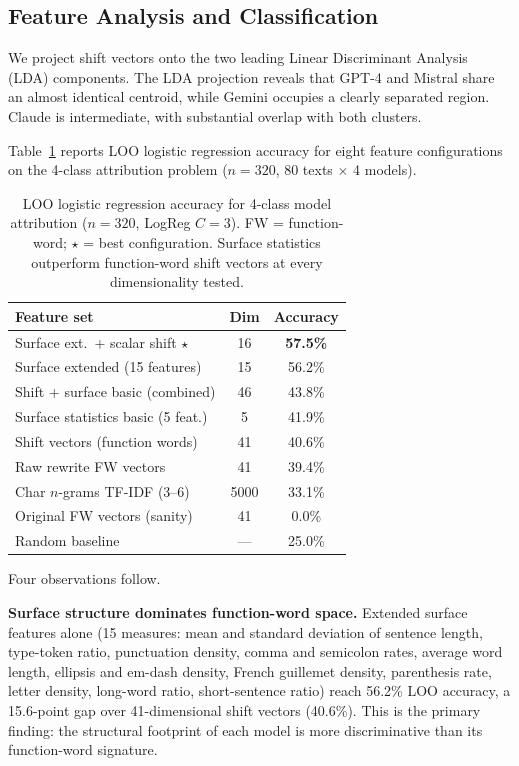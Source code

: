 \documentclass[11pt,a4paper]{article}
\begin{document}
\subsection{Feature Analysis and Classification}

We project shift vectors onto the two leading Linear Discriminant
Analysis (LDA) components.
The LDA projection reveals that GPT-4 and
Mistral share an almost identical centroid, while Gemini occupies
a clearly separated region.
Claude is intermediate, with substantial overlap with both clusters.

Table~\ref{tab:baselines} reports LOO logistic regression accuracy
for eight feature configurations on the 4-class attribution problem
($n = 320$, 80 texts $\times$ 4 models).

\begin{table}[h]
\centering
\small
\begin{tabular}{lcc}
\toprule
\textbf{Feature set} & \textbf{Dim} & \textbf{Accuracy} \\
\midrule
Surface ext.\ + scalar shift $\star$ & 16   & \textbf{57.5\%} \\
Surface extended (15 features)        & 15   & 56.2\% \\
Shift + surface basic (combined)      & 46   & 43.8\% \\
Surface statistics basic (5 feat.)    &  5   & 41.9\% \\
Shift vectors (function words)        & 41   & 40.6\% \\
Raw rewrite FW vectors                & 41   & 39.4\% \\
Char $n$-grams TF-IDF (3--6)         & 5000 & 33.1\% \\
Original FW vectors (sanity)          & 41   &  0.0\% \\
\midrule
Random baseline                       & ---  & 25.0\% \\
\bottomrule
\end{tabular}
\caption{LOO logistic regression accuracy for 4-class model attribution
  ($n = 320$, LogReg $C = 3$).
  FW = function-word; $\star$ = best configuration.
  Surface statistics outperform function-word shift vectors at every
  dimensionality tested.}
\label{tab:baselines}
\end{table}

Four observations follow.

\textbf{Surface structure dominates function-word space.}
Extended surface features alone (15 measures: mean and standard deviation
of sentence length, type-token ratio, punctuation density, comma and
semicolon rates, average word length, ellipsis and em-dash density,
French guillemet density, parenthesis rate, letter density,
long-word ratio, short-sentence ratio) reach 56.2\% LOO accuracy,
a 15.6-point gap over 41-dimensional shift vectors (40.6\%).
This is the primary finding: the structural footprint of each model
is more discriminative than its function-word signature.
\end{document}

